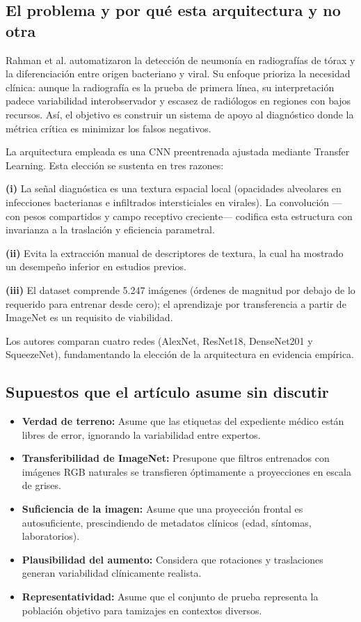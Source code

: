 \documentclass[11pt]{article}
\begin{document}
\subsection{El problema y por qué esta arquitectura y no otra}

Rahman et al. \parencite{rahman2020} automatizaron la detección de neumonía en radiografías de tórax y la diferenciación entre origen bacteriano y viral. Su enfoque prioriza la necesidad clínica: aunque la radiografía es la prueba de primera línea, su interpretación padece variabilidad interobservador y escasez de radiólogos en regiones con bajos recursos. Así, el objetivo es construir un sistema de apoyo al diagnóstico donde la métrica crítica es minimizar los falsos negativos.

La arquitectura empleada es una CNN preentrenada ajustada mediante Transfer Learning. Esta elección se sustenta en tres razones:

\textbf{(i)} La señal diagnóstica es una textura espacial local (opacidades alveolares en infecciones bacterianas e infiltrados intersticiales en virales). La convolución —con pesos compartidos y campo receptivo creciente— codifica esta estructura con invarianza a la traslación y eficiencia parametral.

\textbf{(ii)} Evita la extracción manual de descriptores de textura, la cual ha mostrado un desempeño inferior en estudios previos.

\textbf{(iii)} El dataset comprende 5.247 imágenes (órdenes de magnitud por debajo de lo requerido para entrenar desde cero); el aprendizaje por transferencia a partir de ImageNet es un requisito de viabilidad.

Los autores comparan cuatro redes (AlexNet, ResNet18, DenseNet201 y SqueezeNet), fundamentando la elección de la arquitectura en evidencia empírica.

\subsection{Supuestos que el artículo asume sin discutir}

\begin{itemize}
  \item \textbf{Verdad de terreno:} Asume que las etiquetas del expediente médico están libres de error, ignorando la variabilidad entre expertos.
  \item \textbf{Transferibilidad de ImageNet:} Presupone que filtros entrenados con imágenes RGB naturales se transfieren óptimamente a proyecciones en escala de grises.
  \item \textbf{Suficiencia de la imagen:} Asume que una proyección frontal es autosuficiente, prescindiendo de metadatos clínicos (edad, síntomas, laboratorios).
  \item \textbf{Plausibilidad del aumento:} Considera que rotaciones y traslaciones generan variabilidad clínicamente realista.
  \item \textbf{Representatividad:} Asume que el conjunto de prueba representa la población objetivo para tamizajes en contextos diversos.
\end{itemize}
\end{document}
